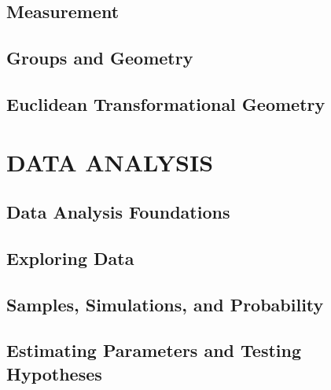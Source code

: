 \documentclass[
]{book}
\theoremstyle{definition}
\theoremstyle{definition}
\theoremstyle{definition}
\theoremstyle{remark}
\begin{document}
\hypertarget{ch:measurement}{%
\chapter{Measurement}\label{ch:measurement}}

\hypertarget{ch:algebraic-geometry}{%
\chapter{Groups and Geometry}\label{ch:algebraic-geometry}}

\hypertarget{ch:transformations}{%
\chapter{Euclidean Transformational Geometry}\label{ch:transformations}}

\hypertarget{part-data-analysis}{%
\part{DATA ANALYSIS}\label{part-data-analysis}}

\hypertarget{ch:data1}{%
\chapter{Data Analysis Foundations}\label{ch:data1}}

\hypertarget{ch:data-explore}{%
\chapter{Exploring Data}\label{ch:data-explore}}

\hypertarget{ch:simulations}{%
\chapter{Samples, Simulations, and Probability}\label{ch:simulations}}

\hypertarget{ch:parameters}{%
\chapter{Estimating Parameters and Testing Hypotheses}\label{ch:parameters}}

  
\end{document}
